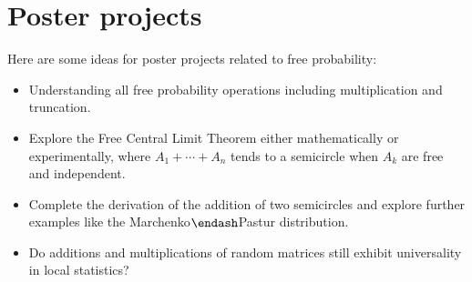 \section{Poster projects}
Here are some ideas for poster projects related to free probability:

\begin{itemize}
\item[1. ] Understanding all free probability operations including multiplication and truncation.


\item[2. ] Explore the Free Central Limit Theorem either mathematically or experimentally,  where $A_1 + \ensuremath{\cdots} + A_n$ tends to a semicircle when $A_k$ are free and independent.


\item[3. ] Complete the derivation of the addition of two semicircles and explore further examples like the Marchenko\ensuremath{\endash}Pastur distribution.


\item[4. ] Do additions and multiplications of random matrices still exhibit universality in local statistics?

\end{itemize}

